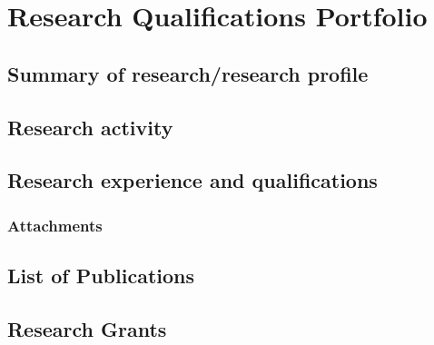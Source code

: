 \chapter{Research Qualifications Portfolio}

\section{Summary of research/research profile}

\section{Research activity}

\section{Research experience and qualifications}

\subsection{Attachments}

\section{List of Publications}

\section{Research Grants}
